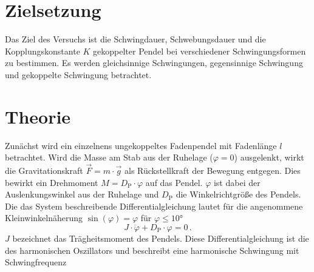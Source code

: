 \section{Zielsetzung}
\label{sec:Zielsetzung}
Das Ziel des Versuchs ist die Schwingdauer, Schwebungsdauer und die Kopplungskonstante $K$ gekoppelter Pendel bei verschiedener Schwingungsformen zu bestimmen. 
Es werden gleichsinnige Schwingungen, gegensinnige Schwingung und gekoppelte Schwingung betrachtet.  

\section{Theorie}
\label{sec:Theorie}
Zunächst wird ein einzelnens ungekoppeltes Fadenpendel mit Fadenlänge $l$ betrachtet. 
Wird die Masse am Stab aus der Ruhelage ($\varphi = 0$) ausgelenkt, wirkt 
die Gravitationskraft $\vec{F} = m \cdot \vec{g}$ als Rückstellkraft der Bewegung entgegen. Dies bewirkt ein Drehmoment 
$M = D_{\text{P}} \cdot \varphi$ auf das Pendel. $\varphi$ ist dabei der Auslenkungswinkel aus der Ruhelage und $D_{\text{P}}$ die 
Winkelrichtgröße des Pendels. Die das System beschreibende Differentialgleichung lautet für die angenommene Kleinwinkelnäherung 
$\sin(\varphi) = \varphi$ für $\varphi \leq 10°$
\begin{equation*}
    J \cdot \ddot{\varphi} + D_{\text{P}} \cdot \varphi = 0\,.
\end{equation*}
$J$ bezeichnet das Trägheitsmoment des Pendels. Diese Differentialgleichung ist die des harmonischen Oszillators und beschreibt eine harmonische Schwingung 
mit Schwingfrequenz 


